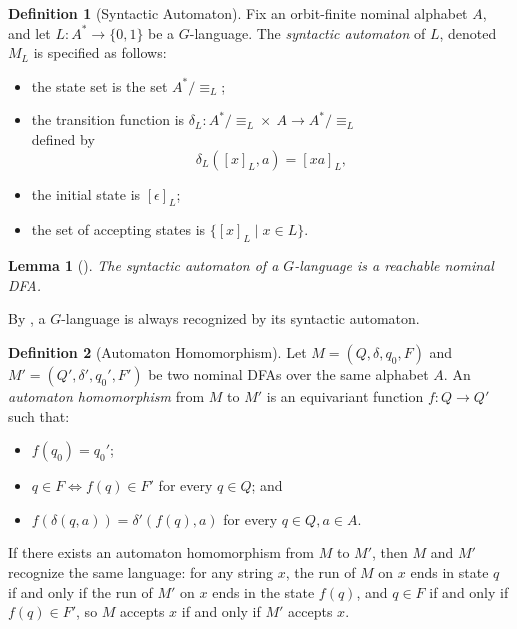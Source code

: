 \documentclass[11pt,a4paper]{amsart}
\newtheorem{lemma}{Lemma}
\theoremstyle{definition}
\newtheorem{definition}{Definition}
\begin{document}
\begin{definition}[Syntactic Automaton]
    Fix an orbit-finite nominal alphabet $A$, and let $L : A^* \to \{0,1\}$ be a $G$-language. The \emph{syntactic automaton} of $L$, denoted $M_L$ is specified as follows: 
    \begin{itemize}
        \item the state set is the set $A^* / \equiv_L$;
        \item the transition function is $\delta_L : A^* / \equiv_L \times \ A \to A^* / \equiv_L$\\ defined by 
        \[
            \delta_L([x]_L, a) = [xa]_L,
        \]
        \item the initial state is $[\epsilon]_L$;
        \item the set of accepting states is $\{[x]_L \mid x \in L\}$.
    \end{itemize}
\end{definition}

\begin{lemma}[{\cite[Lemma 3.6; Proposition 5.1]{bojanczyk-klin-lasota:automata-theory-in-nominal-sets}}]
    The syntactic automaton of a $G$-language is a reachable nominal DFA.
\end{lemma}

By \cite[Lemma 3.7]{bojanczyk-klin-lasota:automata-theory-in-nominal-sets}, a $G$-language is always recognized by its syntactic automaton.

\begin{definition}[Automaton Homomorphism]
    Let $M = (Q, \delta, q_0, F)$ and $M' = (Q', \delta', q_0', F')$ be two nominal DFAs over the same alphabet $A$. 
    An \emph{automaton homomorphism} from $M$ to $M'$ is an equivariant function $f : Q \to Q'$ such that:
    \begin{itemize}
        \item $f(q_0) = q_0'$;
        \item $q \in F \iff f(q) \in F'$ for every $q \in Q$; and 
        \item $f(\delta(q,a)) = \delta'(f(q), a)$ for every $q \in Q, a \in A$.
    \end{itemize}
\end{definition}

If there exists an automaton homomorphism from $M$ to $M'$, then $M$ and $M'$ recognize the same language: for any string $x$, the run of $M$ on $x$ ends in state $q$ if and only if the run of $M'$ on $x$ ends in the state $f(q)$, and $q \in F$ if and only if $f(q) \in F'$, so $M$ accepts $x$ if and only if $M'$ accepts $x$.
\end{document}
